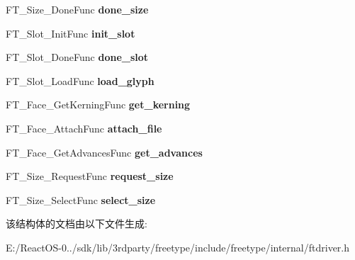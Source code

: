 \begin{DoxyCompactItemize}
\mbox{\label{struct_f_t___driver___class_rec___a5c96f627816a089b27bcff09f22dd1a6}} 
F\+T\+\_\+\+Size\+\_\+\+Done\+Func {\bfseries done\+\_\+size}
\item 
\mbox{\label{struct_f_t___driver___class_rec___ae4e1d4ec7bdbdee0b4a5f8fc8f113d30}} 
F\+T\+\_\+\+Slot\+\_\+\+Init\+Func {\bfseries init\+\_\+slot}
\item 
\mbox{\label{struct_f_t___driver___class_rec___a548a343f5921f5d341142bf3743c42d4}} 
F\+T\+\_\+\+Slot\+\_\+\+Done\+Func {\bfseries done\+\_\+slot}
\item 
\mbox{\label{struct_f_t___driver___class_rec___a49dbd71e64094d4d825b8b8d51dd4e47}} 
F\+T\+\_\+\+Slot\+\_\+\+Load\+Func {\bfseries load\+\_\+glyph}
\item 
\mbox{\label{struct_f_t___driver___class_rec___a398395bfdbef65a8d531724d200ed91c}} 
F\+T\+\_\+\+Face\+\_\+\+Get\+Kerning\+Func {\bfseries get\+\_\+kerning}
\item 
\mbox{\label{struct_f_t___driver___class_rec___a9caec9ae56a4bab9c90cede699279f29}} 
F\+T\+\_\+\+Face\+\_\+\+Attach\+Func {\bfseries attach\+\_\+file}
\item 
\mbox{\label{struct_f_t___driver___class_rec___aad560cd145b6d7cab7eae79194b1d724}} 
F\+T\+\_\+\+Face\+\_\+\+Get\+Advances\+Func {\bfseries get\+\_\+advances}
\item 
\mbox{\label{struct_f_t___driver___class_rec___a03ff7c2e4a2fb6d08eb481b03a78e8de}} 
F\+T\+\_\+\+Size\+\_\+\+Request\+Func {\bfseries request\+\_\+size}
\item 
\mbox{\label{struct_f_t___driver___class_rec___a1b365eb82525dae0a816974d949fe0dd}} 
F\+T\+\_\+\+Size\+\_\+\+Select\+Func {\bfseries select\+\_\+size}
\end{DoxyCompactItemize}


该结构体的文档由以下文件生成\+:\begin{DoxyCompactItemize}
\item 
E\+:/\+React\+O\+S-\/0../sdk/lib/3rdparty/freetype/include/freetype/internal/ftdriver.\+h\end{DoxyCompactItemize}
